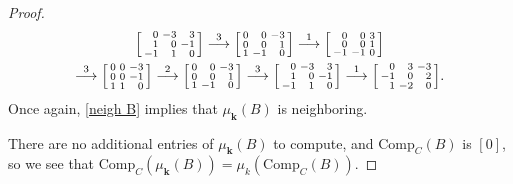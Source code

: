 \documentclass{amsart}
\theoremstyle{definition}
\theoremstyle{remark}
\numberwithin{equation}{section}
\newcommand{\0}{{\mathbf{0}}}
\newcommand{\Comp}{\mathrm{Comp}_C}
\newcommand{\kk}{\mathbf{k}}
\begin{document}
\begin{proof}
\begin{multline*}
\begin{bsmallmatrix*}[r]
0&-3&3\\
1&0&-1\\
-1&1&0
\end{bsmallmatrix*}
\overset{3}{\longrightarrow}
\begin{bsmallmatrix*}[r]
0&0&-3\\
0&0&1\\
1&-1&0
\end{bsmallmatrix*}
\overset{1}{\longrightarrow}
\begin{bsmallmatrix*}[r]
0&0&3\\
0&0&1\\
-1&-1&0
\end{bsmallmatrix*}\\
\overset{3}{\longrightarrow}
\begin{bsmallmatrix*}[r]
0&0&-3\\
0&0&-1\\
1&1&0
\end{bsmallmatrix*}
\overset{2}{\longrightarrow}
\begin{bsmallmatrix*}[r]
0&0&-3\\
0&0&1\\
1&-1&0
\end{bsmallmatrix*}
\overset{3}{\longrightarrow}
\begin{bsmallmatrix*}[r]
0&-3&3\\
1&0&-1\\
-1&1&0
\end{bsmallmatrix*}
\overset{1}{\longrightarrow}
\begin{bsmallmatrix*}[r]
0&3&-3\\
-1&0&2\\
1&-2&0
\end{bsmallmatrix*}.
\end{multline*}
Once again, \cref{neigh B} implies that $\mu_\kk(B)$ is neighboring.

There are no additional entries of $\mu_\kk(B)$ to compute, and $\Comp(B)$ is $[0]$, so we see that $\Comp(\mu_\kk(B))=\mu_k(\Comp(B))$.


\end{proof}
\end{document}
